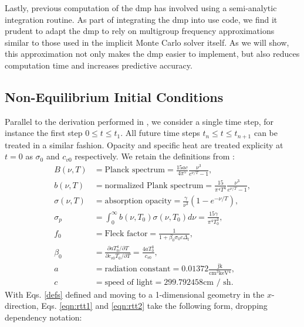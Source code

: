 Lastly, previous computation of the \gls{dmp} has involved using a semi-analytic integration routine.  As part of integrating the \gls{dmp} into use code, we find it prudent to adapt the \gls{dmp} to rely on multigroup frequency approximations similar to those used in the implicit Monte Carlo solver itself.  As we will show, this approximation not only makes the \gls{dmp} easier to implement, but also reduces computation time and increases predictive accuracy.
\belowSubSecSkip

%
%
\aboveSubSecSkip
\subsection{Non-Equilibrium Initial Conditions}
\noindent
	\indent 
Parallel to the derivation performed in \cite{WolLarDen}, we consider a single time step, for instance the first step $0\leq t\leq t_1$.  All future time steps $t_n\leq t\leq t_{n+1}$ can be treated in a similar fashion.  Opacity and specific heat are treated explicity at $t=0$ as $\sigma_0$ and $c_{v0}$ respectively.  We retain the definitions from \cite{WolLarDen}:\\
\begin{subequations}\label{defs}
\begin{align}
B(\nu,T) & =\mbox{Planck spectrum}
  =\frac{15ac}{4\pi^5}\frac{\nu^3}{e^{\nu/T}-1},\\
b(\nu,T) & =\mbox{normalized Plank spectrum}
  =\frac{15}{\pi^4T^4} \frac{\nu^3}{e^{\nu/T}-1}, \\
\sigma(\nu,T) & =\mbox{absorption opacity}=\frac{\gamma}{\nu^3}(1-e^{-\nu/T}),\\
\sigma_p &
  =\int_0^\infty b(\nu,T_0)\sigma(\nu,T_0)d\nu=\frac{15\gamma}{\pi^4T_0^3},\\
f_0 & =\mbox{Fleck factor}=\frac{1}{1+\beta_0\sigma_0c\Delta_t},\\
\beta_0 & =\frac{\partial aT_0^4/\partial T}{\partial
  c_{v0}T_0/\partial T}=\frac{4aT_0^3}{c_{v0}},\\
a & =\mbox{radiation constant}=0.01372 \frac{\mbox{jk}}{\mbox{cm$^3$keV$^4$}},\\
c & =\mbox{speed of light}=299.792458 \mbox{cm $/$ sh}.
\end{align}
\end{subequations}
With Eqs. \eqref{defs} defined and moving to a 1-dimensional geometry in the
$x$-direction, Eqs. \eqref{eqn:rtt1} and \eqref{eqn:rtt2} take the following
form, dropping dependency notation:
